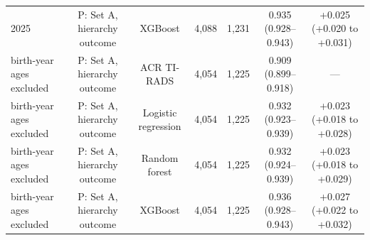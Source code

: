 \begin{table}[htbp]
{\begin{tabular}{@{}lcccccc@{}}
2025 & P: Set A, hierarchy outcome & XGBoost & 4,088 & 1,231 & 0.935 (0.928--0.943) & +0.025 (+0.020 to +0.031) \\
birth-year ages excluded & P: Set A, hierarchy outcome & ACR TI-RADS & 4,054 & 1,225 & 0.909 (0.899--0.918) & --- \\
birth-year ages excluded & P: Set A, hierarchy outcome & Logistic regression & 4,054 & 1,225 & 0.932 (0.923--0.939) & +0.023 (+0.018 to +0.028) \\
birth-year ages excluded & P: Set A, hierarchy outcome & Random forest & 4,054 & 1,225 & 0.932 (0.924--0.939) & +0.023 (+0.018 to +0.029) \\
birth-year ages excluded & P: Set A, hierarchy outcome & XGBoost & 4,054 & 1,225 & 0.936 (0.928--0.943) & +0.027 (+0.022 to +0.032) \\
\bottomrule
\end{tabular}}
\smallskip{}
\end{table}
